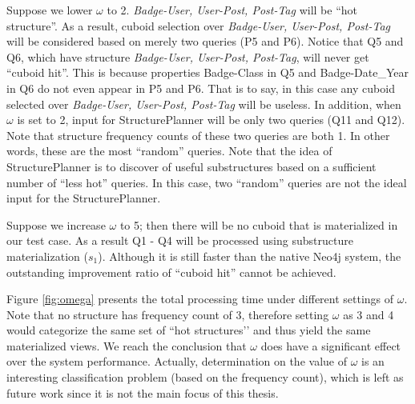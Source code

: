 	Suppose we lower $\omega$ to 2. \textit{Badge-User, User-Post, Post-Tag} will be ``hot structure''. As a result, cuboid selection over \textit{Badge-User, User-Post, Post-Tag} will be considered based on merely two queries (P5 and P6). Notice that Q5 and Q6, which have structure \textit{Badge-User, User-Post, Post-Tag}, will never get ``cuboid hit''. This is because properties Badge-Class in Q5 and Badge-Date\_Year in Q6 do not even appear in P5 and P6. That is to say, in this case any cuboid selected over \textit{Badge-User, User-Post, Post-Tag} will be useless. In addition, when $\omega$ is set to 2, input for StructurePlanner will be only two queries (Q11 and Q12). Note that structure frequency counts of these two queries are both 1. In other words, these are the most ``random'' queries. Note that the idea of StructurePlanner is to discover of useful substructures based on a sufficient number of ``less hot'' queries. In this case, two ``random'' queries are not the ideal input for the StructurePlanner.
	
	Suppose we increase $\omega$ to 5; then there will be no cuboid that is materialized in our test case. As a result Q1 - Q4 will be processed using substructure materialization ($s_1$). Although it is still faster than the native Neo4j system, the outstanding improvement ratio of ``cuboid hit'' cannot be achieved.
	
	Figure \ref{fig:omega} presents the total processing time under different settings of $\omega$. Note that no structure has frequency count of 3, therefore setting $\omega$ as 3 and 4 would categorize the same set of ``hot structures’’ and thus yield the same materialized views. We reach the conclusion that $\omega$ does have a significant effect over the system performance. Actually, determination on the value of $\omega$ is an interesting classification problem (based on the frequency count), which is left as future work since it is not the main focus of this thesis.
	
